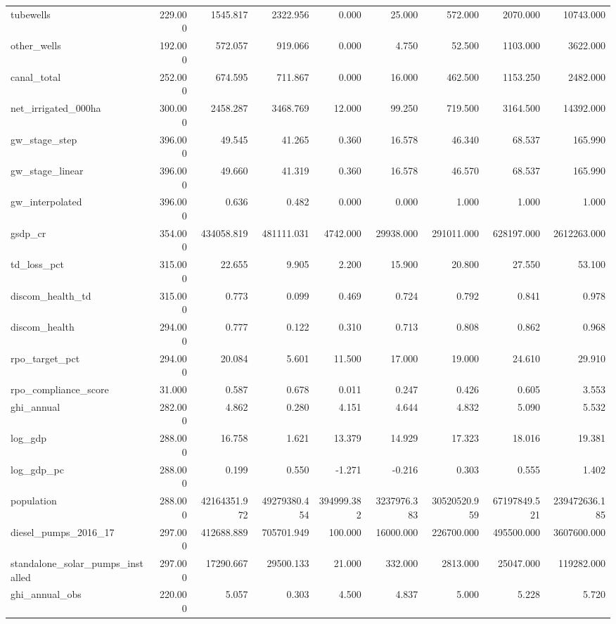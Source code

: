 \begin{tabular}{lrrrrrrrr}
tubewells & 229.000 & 1545.817 & 2322.956 & 0.000 & 25.000 & 572.000 & 2070.000 & 10743.000 \\
other_wells & 192.000 & 572.057 & 919.066 & 0.000 & 4.750 & 52.500 & 1103.000 & 3622.000 \\
canal_total & 252.000 & 674.595 & 711.867 & 0.000 & 16.000 & 462.500 & 1153.250 & 2482.000 \\
net_irrigated_000ha & 300.000 & 2458.287 & 3468.769 & 12.000 & 99.250 & 719.500 & 3164.500 & 14392.000 \\
gw_stage_step & 396.000 & 49.545 & 41.265 & 0.360 & 16.578 & 46.340 & 68.537 & 165.990 \\
gw_stage_linear & 396.000 & 49.660 & 41.319 & 0.360 & 16.578 & 46.570 & 68.537 & 165.990 \\
gw_interpolated & 396.000 & 0.636 & 0.482 & 0.000 & 0.000 & 1.000 & 1.000 & 1.000 \\
gsdp_cr & 354.000 & 434058.819 & 481111.031 & 4742.000 & 29938.000 & 291011.000 & 628197.000 & 2612263.000 \\
td_loss_pct & 315.000 & 22.655 & 9.905 & 2.200 & 15.900 & 20.800 & 27.550 & 53.100 \\
discom_health_td & 315.000 & 0.773 & 0.099 & 0.469 & 0.724 & 0.792 & 0.841 & 0.978 \\
discom_health & 294.000 & 0.777 & 0.122 & 0.310 & 0.713 & 0.808 & 0.862 & 0.968 \\
rpo_target_pct & 294.000 & 20.084 & 5.601 & 11.500 & 17.000 & 19.000 & 24.610 & 29.910 \\
rpo_compliance_score & 31.000 & 0.587 & 0.678 & 0.011 & 0.247 & 0.426 & 0.605 & 3.553 \\
ghi_annual & 282.000 & 4.862 & 0.280 & 4.151 & 4.644 & 4.832 & 5.090 & 5.532 \\
log_gdp & 288.000 & 16.758 & 1.621 & 13.379 & 14.929 & 17.323 & 18.016 & 19.381 \\
log_gdp_pc & 288.000 & 0.199 & 0.550 & -1.271 & -0.216 & 0.303 & 0.555 & 1.402 \\
population & 288.000 & 42164351.972 & 49279380.454 & 394999.382 & 3237976.383 & 30520520.959 & 67197849.521 & 239472636.185 \\
diesel_pumps_2016_17 & 297.000 & 412688.889 & 705701.949 & 100.000 & 16000.000 & 226700.000 & 495500.000 & 3607600.000 \\
standalone_solar_pumps_installed & 297.000 & 17290.667 & 29500.133 & 21.000 & 332.000 & 2813.000 & 25047.000 & 119282.000 \\
ghi_annual_obs & 220.000 & 5.057 & 0.303 & 4.500 & 4.837 & 5.000 & 5.228 & 5.720 \\

\end{tabular}

